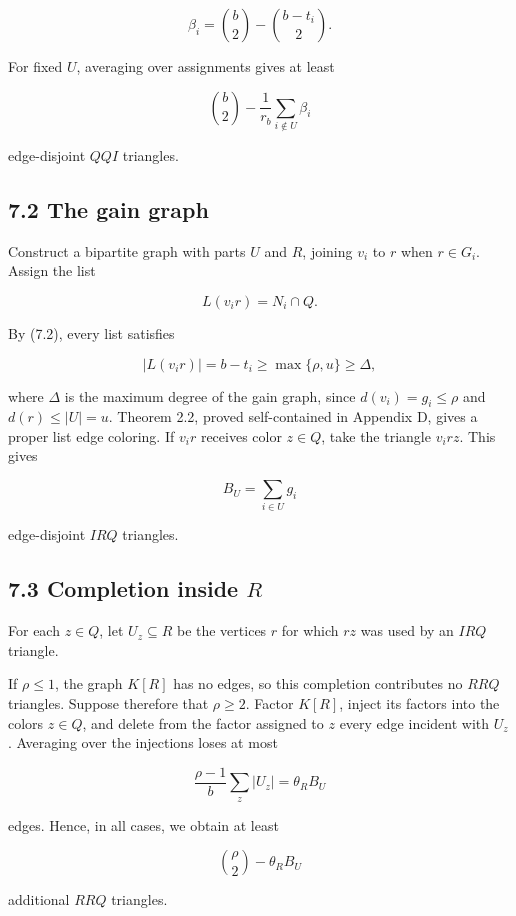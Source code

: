 \documentclass[
  11pt,
]{article}
\begin{document}
\[
\beta_i
=
\binom b2-\binom{b-t_i}{2}.
\tag{7.4}
\]

For fixed \(U\), averaging over assignments gives at least

\[
\binom b2-\frac1{r_b}\sum_{i\notin U}\beta_i
\tag{7.5}
\]

edge-disjoint \(QQI\) triangles.

\subsection{7.2 The gain graph}\label{the-gain-graph}

Construct a bipartite graph with parts \(U\) and \(R\), joining \(v_i\)
to \(r\) when \(r\in G_i\). Assign the list

\[
L(v_ir)=N_i\cap Q.
\]

By (7.2), every list satisfies

\[
|L(v_ir)|=b-t_i
\ge
\max\{\rho,u\}
\ge
\Delta,
\]

where \(\Delta\) is the maximum degree of the gain graph, since
\(d(v_i)=g_i\le\rho\) and \(d(r)\le|U|=u\). Theorem 2.2, proved
self-contained in Appendix D, gives a proper list edge coloring. If
\(v_ir\) receives color \(z\in Q\), take the triangle \(v_irz\). This
gives

\[
B_U=\sum_{i\in U}g_i
\]

edge-disjoint \(IRQ\) triangles.

\subsection{\texorpdfstring{7.3 Completion inside
\(R\)}{7.3 Completion inside R}}\label{completion-inside-r}

For each \(z\in Q\), let \(U_z\subseteq R\) be the vertices \(r\) for
which \(rz\) was used by an \(IRQ\) triangle.

If \(\rho\le1\), the graph \(K[R]\) has no edges, so this completion
contributes no \(RRQ\) triangles. Suppose therefore that \(\rho\ge2\).
Factor \(K[R]\), inject its factors into the colors \(z\in Q\), and
delete from the factor assigned to \(z\) every edge incident with
\(U_z\). Averaging over the injections loses at most

\[
\frac{\rho-1}{b}\sum_z|U_z|
=
\theta_RB_U
\]

edges. Hence, in all cases, we obtain at least

\[
\binom\rho2-\theta_RB_U
\]

additional \(RRQ\) triangles.
\end{document}
